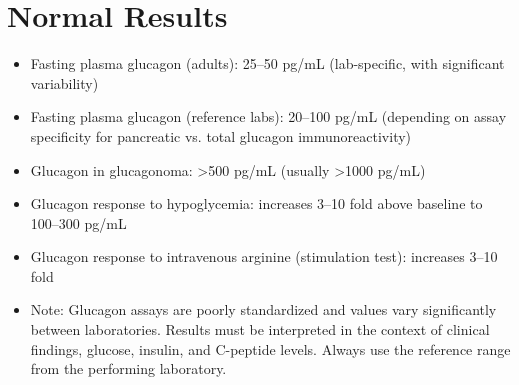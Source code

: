 \section*{Normal Results}
\begin{itemize}
  \item Fasting plasma glucagon (adults): 25--50 pg/mL (lab-specific, with significant variability)
  \item Fasting plasma glucagon (reference labs): 20--100 pg/mL (depending on assay specificity for pancreatic vs. total glucagon immunoreactivity)
  \item Glucagon in glucagonoma: >500 pg/mL (usually >1000 pg/mL)
  \item Glucagon response to hypoglycemia: increases 3--10 fold above baseline to 100--300 pg/mL
  \item Glucagon response to intravenous arginine (stimulation test): increases 3--10 fold
  \item Note: Glucagon assays are poorly standardized and values vary significantly between laboratories. Results must be interpreted in the context of clinical findings, glucose, insulin, and C-peptide levels. Always use the reference range from the performing laboratory.
\end{itemize}

